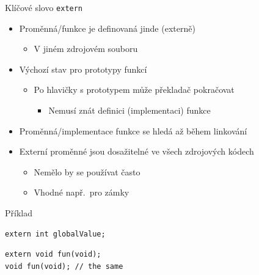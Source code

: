 \begin{frame}[fragile]{Klíčové slovo \texttt{extern}}

  \begin{itemize}
    \item Proměnná/funkce je definovaná jinde (externě)
    \begin{itemize}
      \item V jiném zdrojovém souboru
    \end{itemize}

    \pause

    \item Výchozí stav pro prototypy funkcí
    \begin{itemize}
      \item Po  hlavičky s prototypem může překladač
	pokračovat
      \begin{itemize}
	\item Nemusí znát definici (implementaci) funkce
      \end{itemize}
    \end{itemize}

    \pause

    \item Proměnná/implementace funkce se hledá až během linkování

    \pause

    \item Externí proměnné jsou dosažitelné ve všech zdrojových kódech
    \begin{itemize}
      \item Nemělo by se používat často
      \item Vhodné např.\ pro zámky
    \end{itemize}

  \end{itemize}


\begin{block}{Příklad}
\begin{lstlisting}
extern int globalValue;
\end{lstlisting}
\begin{lstlisting}
extern void fun(void);
void fun(void); // the same
\end{lstlisting}
\end{block}

\end{frame}

